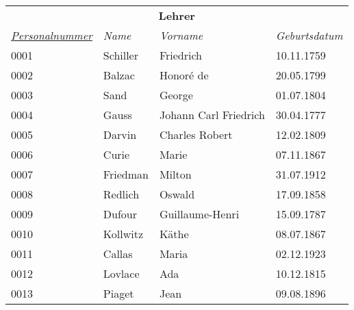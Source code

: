 \documentclass{standalone}
\begin{document}
\begin{tabular}{|l|l|l|l|}
    \hline
    \multicolumn{4}{c}{\cellcolor[HTML]{C0C0C0} \textbf{Lehrer}} \\
    \textit{\underline{Personalnummer}}&
    \textit{Name}&
    \textit{Vorname}&
    \textit{Geburtsdatum} \\ \hline
    0001&Schiller&Friedrich&10.11.1759\\
    0002&Balzac&Honoré de&20.05.1799\\
    0003&Sand&George&01.07.1804\\
    0004&Gauss&Johann Carl Friedrich&30.04.1777\\
    0005&Darvin&Charles Robert&12.02.1809\\
    0006&Curie&Marie&07.11.1867\\
    0007&Friedman&Milton&31.07.1912\\
    0008&Redlich&Oswald&17.09.1858\\
    0009&Dufour&Guillaume-Henri&15.09.1787\\
    0010&Kollwitz&Käthe&08.07.1867\\
    0011&Callas&Maria&02.12.1923\\
    0012&Lovlace&Ada&10.12.1815\\
    0013&Piaget&Jean&09.08.1896\\
    \hline
    \end{tabular}
\end{document}
